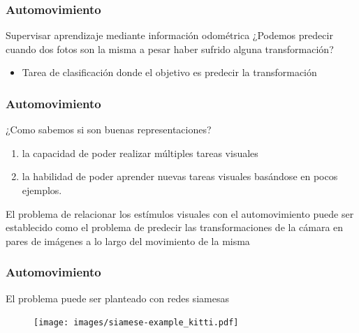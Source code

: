 \documentclass{beamer}
\begin{document}
\begin{frame}[plain]
\frametitle{Automovimiento}
\vfill
Supervisar aprendizaje mediante información odométrica
\vfill
¿Podemos predecir cuando dos fotos son la misma a pesar haber sufrido alguna transformación?\\

\vfill

\begin{itemize}
    \item Tarea de clasificación donde el objetivo es predecir la transformación 
\end{itemize}

\vfill
\end{frame}





\begin{frame}[plain]
\frametitle{Automovimiento}

¿Como sabemos si son buenas representaciones?\\\pause

\vfill
\begin{enumerate}
    \item la capacidad de poder realizar múltiples tareas visuales
    \item la habilidad de poder aprender nuevas tareas visuales basándose en pocos ejemplos.
\end{enumerate}\pause
\vfill

\begin{block}{}
El problema de relacionar los estímulos visuales con el automovimiento puede ser establecido como el problema de predecir las transformaciones de la cámara en pares de imágenes a lo largo del movimiento de la misma
\end{block}
\vfill
\end{frame}




\begin{frame}[plain]
\frametitle{Automovimiento}
El problema puede ser planteado con redes siamesas\\
\vfill
\begin{figure}
    \centering
    \texttt{[image: images/siamese-example\_kitti.pdf]}
\end{figure}
\vfill
\end{frame}
\end{document}
